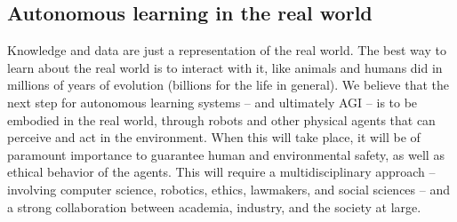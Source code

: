 \subsection*{Autonomous learning in the real world}
%
Knowledge and data are just a representation of the real world.
%
The best way to learn about the real world is to interact with it, like animals and humans did in millions of years of evolution (billions for the life in general).
%
We believe that the next step for autonomous learning systems -- and ultimately \gls{AGI} -- is to be embodied in the real world, through robots and other physical agents that can perceive and act in the environment.
%
When this will take place, it will be of paramount importance to guarantee human and environmental safety, as well as ethical behavior of the agents.
%
This will require a multidisciplinary approach -- involving computer science, robotics, ethics, lawmakers, and social sciences -- and a strong collaboration between academia, industry, and the society at large.
